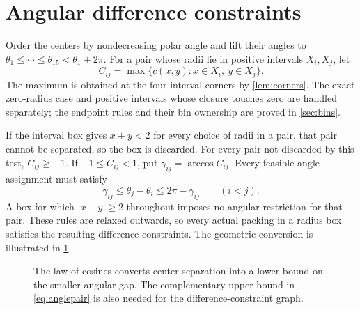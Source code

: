 \documentclass[11pt]{article}
\theoremstyle{definition}
\begin{document}
\section{Angular difference constraints}\label{sec:angular}

Order the centers by nondecreasing polar angle and lift their angles to $\theta_1\le\cdots\le\theta_{15}<\theta_1+2\pi$. For a pair whose radii lie in positive intervals $X_i,X_j$, let
\[
 C_{ij}=\max\{c(x,y):x\in X_i,\ y\in X_j\}.
\]
The maximum is obtained at the four interval corners by \cref{lem:corners}. The exact zero-radius case and positive intervals whose closure touches zero are handled separately; the endpoint rules and their bin ownership are proved in \cref{sec:bins}.

If the interval box gives $x+y<2$ for every choice of radii in a pair, that pair cannot be separated, so the box is discarded. For every pair not discarded by this test, $C_{ij}\ge-1$. If $-1\le C_{ij}<1$, put $\gamma_{ij}=\arccos C_{ij}$. Every feasible angle assignment must satisfy
\begin{equation}\label{eq:anglepair}
 \gamma_{ij}\le\theta_j-\theta_i\le2\pi-\gamma_{ij}\qquad(i<j).
\end{equation}
A box for which $|x-y|\ge2$ throughout imposes no angular restriction for that pair. These rules are relaxed outwards, so every actual packing in a radius box satisfies the resulting difference constraints. The geometric conversion is illustrated in \cref{fig:angle-conversion}.

\begin{figure}[htbp]
\centering
{}
\caption{The law of cosines converts center separation into a lower bound on the smaller angular gap. The complementary upper bound in \cref{eq:anglepair} is also needed for the difference-constraint graph.}
\label{fig:angle-conversion}
\end{figure}
\end{document}
